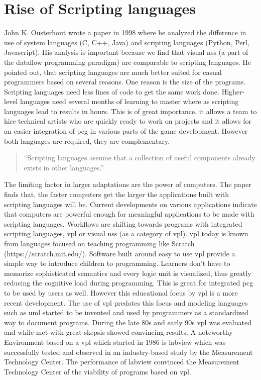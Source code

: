 \documentclass[10pt,a4paper]{article}
\begin{document}
\section{Rise of Scripting languages}\label{sec:scriptingLanguages}
\begin{multicols}{2}
John K. Ousterhout wrote a paper\cite{Ousterhout1998} in 1998 where he analyzed the difference in use of system languages (C, C++, Java) and scripting languages (Python, Perl, Javascript). His analysis is important because we find that visual \gls{ns}s (a part of the dataflow programming paradigm\cite{wiki:Dataflow}) are comparable to scripting languages. He pointed out, that scripting languages are much better suited for casual programmers based on several reasons. One reason is the size of the programs. Scripting languages need less lines of code to get the same work done. Higher-level languages need several months of learning to master where as scripting languages lead to results in hours. This is of great importance, it allows a team to hire technical artists who are quickly ready to work on projects and it allows for an easier integration of \gls{pcg} in various parts of the game development. However both languages are required, they are complementary.\begin{quote}
“Scripting languages assume that a collection of useful components already exists in other languages.”\citep[p.~2]{Ousterhout1998}
\end{quote}
The limiting factor in larger adaptations are the power of computers. The paper finds that, the faster computers get the larger the applications built with scripting languages will be. Current developments on various applications indicate that computers are powerful enough for meaningful applications to be made with scripting languages. Workflows are shifting towards programs with integrated scripting languages, \gls{vpl} or visual \gls{ns}s (as a category of \gls{vpl}).
\gls{vpl} today is known from languages focused on teaching programming like Scratch (https://scratch.mit.edu/). Software built around easy to use \gls{vpl} provide a simple way to introduce children to programming. Learners don’t have to memorize sophisticated semantics and every logic unit is visualized, thus greatly reducing the cognitive load during programming. This is great for integrated \gls{pcg} to be used by users as well. However this educational focus by \gls{vpl} is a more recent development. The use of \gls{vpl} predates this focus and modeling languages such as \gls{uml} started to be invented and used by programmers as a standardized way to document programs. During the late 80s and early 90s \gls{vpl} was evaluated and while met with great skepsis showed convincing results\cite{WHITLEY1997}. A noteworthy Environment based on a \gls{vpl} which started in 1986 is \gls{labview} which was successfully tested and observed in an industry-based study by the Measurement Technology Center\cite{Jamal}. The performance of \gls{labview} convinced the Measurement Technology Center of the viability of programs based on \gls{vpl}.

\end{multicols}
\end{document}
